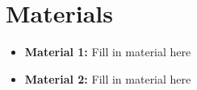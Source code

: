 \documentclass[main.tex]{subfiles}
\begin{document}
\section*{Materials}
\begin{itemize}
  \item \textbf{Material 1:} Fill in material here
  \item \textbf{Material 2:} Fill in material here
\end{itemize}
\end{document}
